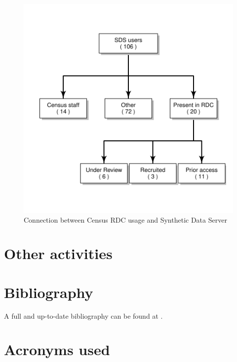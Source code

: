 \documentclass[12pt,titlepage]{article}
\begin{document}
\begin{figure}
\centering
\caption{Connection between Census RDC usage and Synthetic Data Server}\label{fig:rdcUse}
\includegraphics{report_on_SDS_2015-useRDCgraph}
\end{figure}


\section{Other activities}


\section{Bibliography}

A full and up-to-date bibliography can be found at .







\clearpage
\singlespacing

	
	
	
	\section{Acronyms used}
	 
	\newpage
\tableofcontents

%
\end{document}

